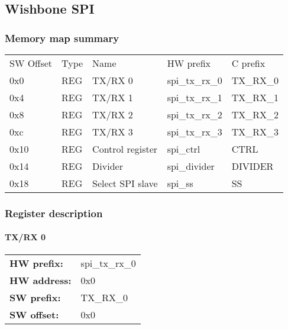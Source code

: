 \subsection{Wishbone SPI}
\label{subsec:wbgen:spi}

\subsubsection{Memory map summary}
\begin{tabular}{|l|l|l|l|l|}
\rowcolor{RoyalPurple}
\color{white} SW Offset & \color{white} Type & \color{white} Name &
\color{white} HW prefix & \color{white} C prefix\\
0x0& REG & TX/RX 0 & spi\_tx\_rx\_0 & TX\_RX\_0\\
0x4& REG & TX/RX 1 & spi\_tx\_rx\_1 & TX\_RX\_1\\
0x8& REG & TX/RX 2 & spi\_tx\_rx\_2 & TX\_RX\_2\\
0xc& REG & TX/RX 3 & spi\_tx\_rx\_3 & TX\_RX\_3\\
0x10& REG & Control register & spi\_ctrl & CTRL\\
0x14& REG & Divider & spi\_divider & DIVIDER\\
0x18& REG & Select SPI slave & spi\_ss & SS\\
\hline
\end{tabular}

\subsubsection{Register description}
\paragraph*{TX/RX 0}\vspace{12pt}

\begin{tabular}{l l }
{\bf HW prefix:}  & spi\_tx\_rx\_0\\
{\bf HW address:}  & 0x0\\
{\bf SW prefix:}  & TX\_RX\_0\\
{\bf SW offset:}  & 0x0\\
\end{tabular}

\vspace{12pt}


